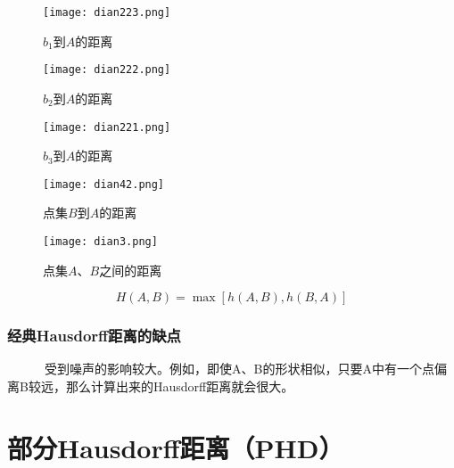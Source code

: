 \documentclass[notheorems,mathserif,table,compress]{beamer}  %
\begin{document}
\begin{frame}

   \begin{figure}[!ht]
    \begin{minipage}{0.3\textwidth}
    \centering
    \texttt{[image: dian223.png]}
    \caption{$b_{1}$到$A$的距离}
    \end{minipage}
    \begin{minipage}{0.3\textwidth}
    \centering
    \texttt{[image: dian222.png]}
    \caption{$b_{2}$到$A$的距离}
    \end{minipage}
    \begin{minipage}{0.3\textwidth}
    \centering
    \texttt{[image: dian221.png]}
    \caption{$b_{3}$到$A$的距离}
    \end{minipage}
   \end{figure}
\end{frame}

\begin{frame}

   \begin{figure}[!ht]
    \centering
    \texttt{[image: dian42.png]}
    \caption{点集$B$到$A$的距离}
   \end{figure}
\end{frame}

\begin{frame}

   \begin{figure}[!ht]
    \centering
    \texttt{[image: dian3.png]}
    \caption{点集$A$、$B$之间的距离}
   \end{figure}
\begin{displaymath}
H(A,B)=\max[h(A,B),h(B,A)]
\end{displaymath}
\end{frame}

\begin{frame}
\frametitle{经典Hausdorff距离的缺点}
~~~~~~受到噪声的影响较大。例如，即使A、B的形状相似，只要A中有一个点偏离B较远，那么计算出来的Hausdorff距离就会很大。
\end{frame}

\section{部分Hausdorff距离（PHD）}
\end{document}
